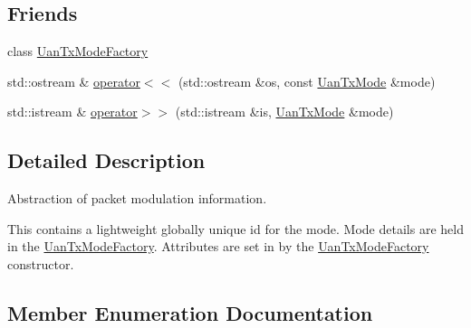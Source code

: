 \subsection*{Friends}
\begin{DoxyCompactItemize}
\item 
class \hyperlink{classns3_1_1UanTxMode_a2059e78c06dc66c4f8654363fa12c2c0}{Uan\+Tx\+Mode\+Factory}
\item 
std\+::ostream \& \hyperlink{classns3_1_1UanTxMode_a1b87097d4efc5f6d8d10c596a517fb6a}{operator$<$$<$} (std\+::ostream \&os, const \hyperlink{classns3_1_1UanTxMode}{Uan\+Tx\+Mode} \&mode)
\item 
std\+::istream \& \hyperlink{classns3_1_1UanTxMode_a6d814ee8e21cc2a0c8d4c6fbb8f36f3b}{operator$>$$>$} (std\+::istream \&is, \hyperlink{classns3_1_1UanTxMode}{Uan\+Tx\+Mode} \&mode)
\end{DoxyCompactItemize}


\subsection{Detailed Description}
Abstraction of packet modulation information.

This contains a lightweight globally unique id for the mode. Mode details are held in the \hyperlink{classns3_1_1UanTxModeFactory}{Uan\+Tx\+Mode\+Factory}. Attributes are set in by the \hyperlink{classns3_1_1UanTxModeFactory}{Uan\+Tx\+Mode\+Factory} constructor. 

\subsection{Member Enumeration Documentation}
